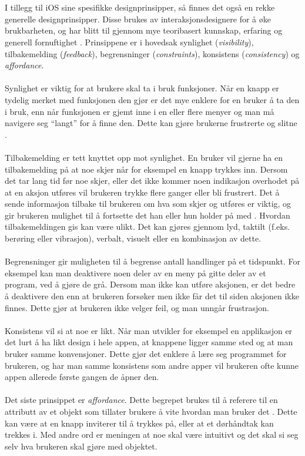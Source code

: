 \\\\
I tillegg til iOS sine spesifikke designprinsipper, så finnes det også en rekke generelle designprinsipper. Disse brukes av interaksjonsdesignere for å øke brukbarheten, og har blitt til gjennom mye teoribasert kunnskap, erfaring og generell fornuftighet \cite[p.~26]{preece}. Prinsippene er i hovedsak synlighet (\textit{visibility}), tilbakemelding (\textit{feedback}), begrensninger (\textit{constraints}), konsistens (\textit{consistency}) og \textit{affordance}.
\\\\
Synlighet er viktig for at brukere skal ta i bruk funksjoner. Når en knapp er tydelig merket med funksjonen den gjør er det mye enklere for en bruker å ta den i bruk, enn når funksjonen er gjemt inne i en eller flere menyer og man må navigere seg “langt” for å finne den. Dette kan gjøre brukerne frustrerte og slitne \cite[p.~26]{preece}.
\\\\	
Tilbakemelding er tett knyttet opp mot synlighet. En bruker vil gjerne ha en tilbakemelding på at noe skjer når for eksempel en knapp trykkes inn. Dersom det tar lang tid før noe skjer, eller det ikke kommer noen indikasjon overhodet på at en aksjon utføres vil brukeren trykke flere ganger eller bli frustrert. Det å sende informasjon tilbake til brukeren om hva som skjer og utføres er viktig, og gir brukeren mulighet til å fortsette det han eller hun holder på med \cite[p.~26]{preece}. Hvordan tilbakemeldingen gis kan være ulikt. Det kan gjøres gjennom lyd, taktilt (f.eks. berøring eller vibrasjon), verbalt, visuelt eller en kombinasjon av dette.
\\\\
Begrensninger gir muligheten til å begrense antall handlinger på et tidspunkt. For eksempel kan man deaktivere noen deler av en meny på gitte deler av et program, ved å gjøre de grå. Dersom man ikke kan utføre aksjonen, er det bedre å deaktivere den enn at brukeren forsøker men ikke får det til siden aksjonen ikke finnes. Dette gjør at brukeren ikke velger feil, og man unngår frustrasjon.
\\\\
Konsistens vil si at noe er likt. Når man utvikler for eksempel en applikasjon er det lurt å ha likt design i hele appen, at knappene ligger samme sted og at man bruker samme konvensjoner. Dette gjør det enklere å lære seg programmet for brukeren, og har man samme konsistens som andre apper vil brukeren ofte kunne appen allerede første gangen de åpner den. 
\\\\
Det siste prinsippet er \textit{affordance}. Dette begrepet brukes til å referere til en attributt av et objekt som tillater brukere å vite hvordan man bruker det \cite[p.~29]{preece}. Dette kan være at en knapp inviterer til å trykkes på, eller at et dørhåndtak kan trekkes i. Med andre ord er meningen at noe skal være intuitivt og det skal si seg selv hva brukeren skal gjøre med objektet. 

